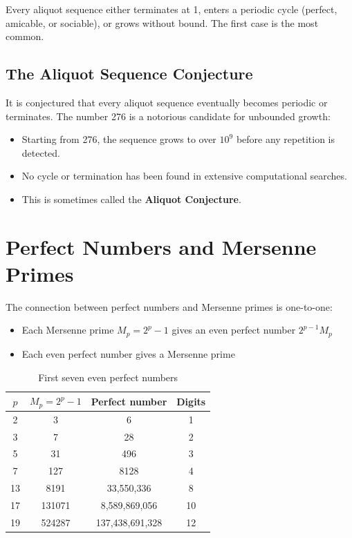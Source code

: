 \begin{theorem}
Every aliquot sequence either terminates at 1, enters a periodic cycle (perfect, amicable, or sociable), or grows without bound. The first case is the most common.
\end{theorem}

\subsection{The Aliquot Sequence Conjecture}

It is conjectured that every aliquot sequence eventually becomes periodic or terminates. The number 276 is a notorious candidate for unbounded growth:

\begin{itemize}
    \item Starting from 276, the sequence grows to over $10^9$ before any repetition is detected.
    \item No cycle or termination has been found in extensive computational searches.
    \item This is sometimes called the \textbf{Aliquot Conjecture}.
\end{itemize}

\section{Perfect Numbers and Mersenne Primes}

The connection between perfect numbers and Mersenne primes is one-to-one:
\begin{itemize}
    \item Each Mersenne prime $M_p = 2^p - 1$ gives an even perfect number $2^{p-1} M_p$
    \item Each even perfect number gives a Mersenne prime
\end{itemize}

\begin{table}[H]
\centering
\begin{tabular}{c|c|c|c}
$p$ & $M_p = 2^p - 1$ & Perfect number & Digits \\
\hline
2 & 3 & 6 & 1 \\
3 & 7 & 28 & 2 \\
5 & 31 & 496 & 3 \\
7 & 127 & 8128 & 4 \\
13 & 8191 & 33,550,336 & 8 \\
17 & 131071 & 8,589,869,056 & 10 \\
19 & 524287 & 137,438,691,328 & 12 \\
\end{tabular}
\caption{First seven even perfect numbers}
\label{tab:perfect_numbers}
\end{table}


